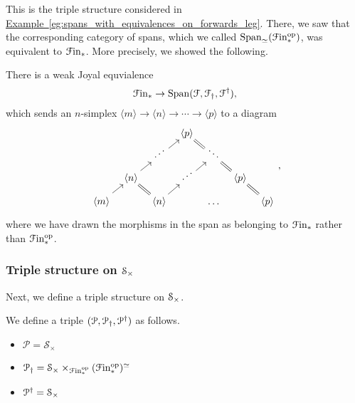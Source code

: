 \documentclass[main.tex]{subfiles}
\begin{document}
This is the triple structure considered in \hyperref[eg:spans_with_equivalences_on_forwards_leg]{Example~\ref*{eg:spans_with_equivalences_on_forwards_leg}}. There, we saw that the corresponding category of spans, which we called $\Span_{\simeq}(\Finp\op)$, was equivalent to $\Finp$. More precisely, we showed the following.

\begin{lemma}
  There is a weak Joyal equvialence
  \begin{equation*}
    \Finp \to \Span\triple{F},
  \end{equation*}
  which sends an $n$-simplex $\langle m \rangle \to \langle n \rangle \to \cdots \to \langle p \rangle$ to a diagram
  \begin{equation*}
    \begin{tikzcd}[row sep=small, column sep=tiny]
      &&& \respace{\langle p \rangle}
      \\
      && \respace{\iddots}
      \arrow[ur]
      && \respace{\ddots}
      \arrow[ul, equals]
      \\
      & \respace{\langle n \rangle}
      \arrow[ur]
      && \respace{\iddots}
      \arrow[ur]
      && \respace{\langle p \rangle}
      \arrow[ul, equals]
      \\
      \langle m \rangle
      \arrow[ur]
      && \respace{\langle n \rangle}
      \arrow[ul, equals]
      \arrow[ur]
      && \respace{\dots}
      && \respace{\langle p \rangle}
      \arrow[ul, equals]
    \end{tikzcd},
  \end{equation*}
  where we have drawn the morphisms in the span as belonging to $\Finp$ rather than $\Finp\op$.
\end{lemma}

\subsubsection*{Triple structure on \texorpdfstring{$\S_{\times}$}{S}}

Next, we define a triple structure on $\S_{\times}$.

\begin{definition}
  We define a triple $\triple{P}$ as follows.
  \begin{itemize}
    \item $\mathcal{P} = \mathcal{S}_{\times}$

    \item $\mathcal{P}\downdag = \mathcal{S}_{\times} \times_{\Finp\op} (\Finp\op)^{\simeq}$

    \item $\mathcal{P}\updag = \mathcal{S}_{\times}$
  \end{itemize}
\end{definition}
\end{document}
